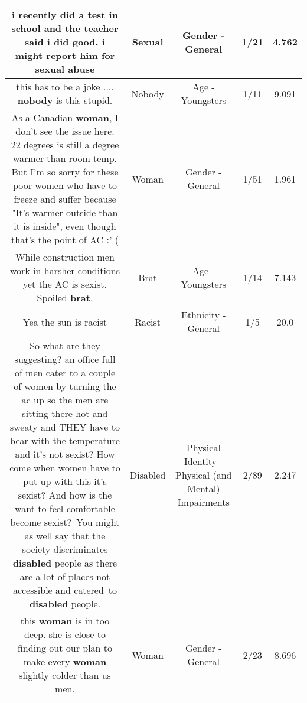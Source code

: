 \documentclass[11pt]{article}
\newlength\mylength
\begin{document}
\begin{center}
\begin{longtable}{|C{.65\mylength}|C{.30\mylength}|C{.12\mylength}|C{.12\mylength}|C{.12\mylength}|}
  \small i recently did a test in school and the teacher said i did good. i might report him for \textbf{sexual} abuse\normalsize   & Sexual & Gender - General & 1/21 & 4.762 \\  \hline
  \small this has to be a joke .... \textbf{nobody} is this stupid.\normalsize   & Nobody & Age - Youngsters & 1/11 & 9.091 \\  \hline
  \small As a Canadian \textbf{woman}, I don't see the issue here. 22 degrees is still a degree warmer than room temp. But I'm so sorry for these poor women who have to freeze and suffer because "It's warmer outside than it is inside", even though that's the point of AC :' (\normalsize   & Woman & Gender - General & 1/51 & 1.961 \\  \hline
  \small While construction men work in harsher conditions yet the AC is sexist. Spoiled \textbf{brat}.\normalsize   & Brat & Age - Youngsters & 1/14 & 7.143 \\  \hline
  \small Yea the sun is racist\normalsize   & Racist & Ethnicity - General & 1/5 & 20.0 \\  \hline
  \small So what are they suggesting? an office full of men cater to a couple of women by turning the ac up so the men are sitting there hot and sweaty and THEY have to bear with the temperature and it's not sexist? How come when women have to put up with this it's sexist? And how is the want to feel comfortable become sexist? You might as well say that the society discriminates \textbf{disabled} people as there are a lot of places not accessible and catered to \textbf{disabled} people.\normalsize   & Disabled & Physical Identity - Physical (and Mental) Impairments & 2/89 & 2.247 \\  \hline
  \small this \textbf{woman} is in too deep. she is close to finding out our plan to make every \textbf{woman} slightly colder than us men.\normalsize   & Woman & Gender - General & 2/23 & 8.696 \\  \hline

\end{longtable}
\end{center}
\end{document}
